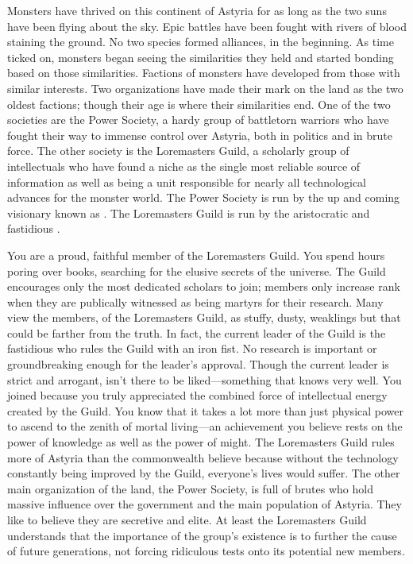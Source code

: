 \documentclass[blue]{guildcamp2}
\begin{document}
\name{\bLoremasters{}}



Monsters have thrived on this continent of Astyria for as long as the two suns have been flying about the sky. Epic battles have been fought with rivers of blood staining the ground. No two species formed alliances, in the beginning. As time ticked on, monsters began seeing the similarities they held and started bonding based on those similarities. Factions of monsters have developed from those with similar interests. Two organizations have made their mark on the land as the two oldest factions; though their age is where their similarities end. One of the two societies are the Power Society, a hardy group of battletorn warriors who have fought their way to immense control over Astyria, both in politics and in brute force. The other society is the Loremasters Guild, a scholarly group of intellectuals who have found a niche as the single most reliable source of information as well as being a unit responsible for nearly all technological advances for the monster world. The Power Society is run by the up and coming visionary known as \cRed{}. The Loremasters Guild is run by the aristocratic and fastidious \cVampire{}.

You are a proud, faithful member of the Loremasters Guild. You spend hours poring over books, searching for the elusive secrets of the universe. The Guild encourages only the most dedicated scholars to join; members only increase rank when they are publically witnessed as being martyrs for their research. Many view the members, of the Loremasters Guild, as stuffy, dusty, weaklings but that could be farther from the truth. In fact, the current leader of the Guild is the fastidious \cVampire{} who rules the Guild with an iron fist. No research is important or groundbreaking enough for the leader's approval. Though the current leader is strict and arrogant, \cVampire{\they} isn't there to be liked---something that \cVampire{\they} knows very well. You joined because you truly appreciated the combined force of intellectual energy created by the Guild. You know that it takes a lot more than just physical power to ascend to the zenith of mortal living---an achievement you believe rests on the power of knowledge as well as the power of might. The Loremasters Guild rules more of Astyria than the commonwealth believe because without the technology constantly being improved by the Guild, everyone's lives would suffer. The other main organization of the land, the Power Society, is full of brutes who hold massive influence over the government and the main population of Astyria. They like to believe they are secretive and elite. At least the Loremasters Guild understands that the importance of the group's existence is to further the cause of future generations, not forcing ridiculous tests onto its potential new members.
\end{document}
